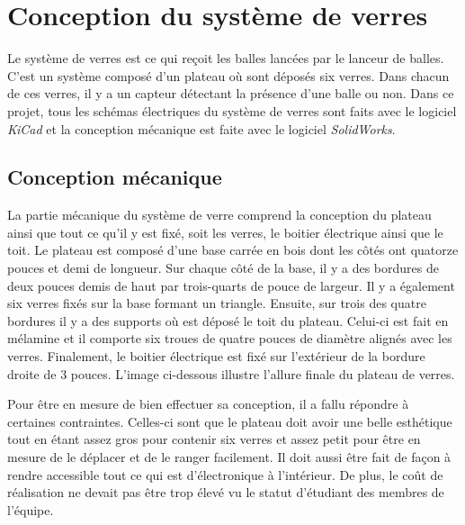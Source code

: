 \section{Conception du système de verres}

Le système de verres est ce qui reçoit les balles lancées par le lanceur de balles.
C’est un système composé d’un plateau où sont déposés six verres.
Dans chacun de ces verres, il y a un capteur détectant la présence d’une balle ou non.
Dans ce projet, tous les schémas électriques du système de verres sont faits avec le logiciel \emph{KiCad} et la conception mécanique est faite avec le logiciel \emph{SolidWorks}.

\subsection{Conception mécanique}

La partie mécanique du système de verre comprend la conception du plateau ainsi que tout ce qu’il y est fixé, soit les verres, le boitier électrique ainsi que le toit.
Le plateau est composé d’une base carrée en bois dont les côtés ont quatorze pouces et demi de longueur.
Sur chaque côté de la base, il y a des bordures de deux pouces demis de haut par trois-quarts de pouce de largeur.
Il y a également six verres fixés sur la base formant un triangle.
Ensuite, sur trois des quatre bordures il y a des supports où est déposé le toit du plateau.
Celui-ci est fait en mélamine et il comporte six troues de quatre pouces de diamètre alignés avec les verres.
Finalement, le boitier électrique est fixé sur l’extérieur de la bordure droite de 3 pouces.
L’image  ci-dessous illustre l’allure finale du plateau de verres.


Pour être en mesure de bien effectuer sa conception, il a fallu répondre à certaines contraintes.
Celles-ci sont que le plateau doit avoir une belle esthétique tout en étant assez gros pour contenir six verres et assez petit pour être en mesure de le déplacer et de le ranger facilement.
Il doit aussi être fait de façon à rendre accessible tout ce qui est d’électronique à l’intérieur.
De plus, le coût de réalisation ne devait pas être trop élevé vu le statut d’étudiant des membres de l’équipe.

